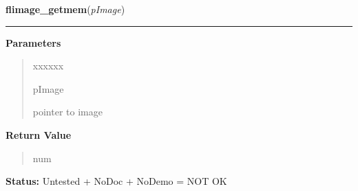     \label{xformslib:library:flimage_getmem}

    \vspace{0.5ex}

\hspace{.8\funcindent}\begin{boxedminipage}{\funcwidth}

    \raggedright \textbf{flimage\_getmem}(\textit{pImage})

    \vspace{-1.5ex}

    \rule{\textwidth}{0.5\fboxrule}
\setlength{\parskip}{2ex}
\setlength{\parskip}{1ex}
      \textbf{Parameters}
      \vspace{-1ex}

      \begin{quote}
        \begin{Ventry}{xxxxxx}

          \item[pImage]

          pointer to image

        \end{Ventry}

      \end{quote}

      \textbf{Return Value}
    \vspace{-1ex}

      \begin{quote}
      num

      \end{quote}

\textbf{Status:} Untested + NoDoc + NoDemo = NOT OK



    \end{boxedminipage}

    \label{xformslib:library:flimage_is_supported}

    \vspace{0.5ex}


